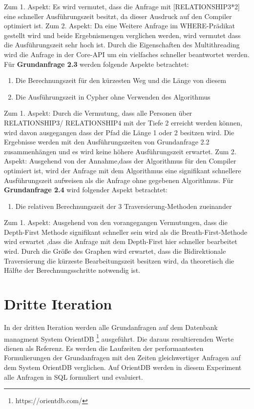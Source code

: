 Zum 1. Aspekt: Es wird vermutet, dass die Anfrage mit [RELATIONSHIP3*2] eine schneller Ausführungszeit besitzt, da dieser Ausdruck auf den Compiler optimiert ist. \newline
Zum 2. Aspekt: Da eine Weitere Anfrage im WHERE-Prädikat gestellt wird und beide Ergebnismengen verglichen werden, wird vermutet dass die Ausführungszeit sehr hoch ist. Durch die Eigenschaften des Multithreading wird die Anfrage in der Core-API um ein vielfaches schneller beantwortet werden. \newline  \newline
Für \textbf{Grundanfrage 2.3} werden folgende Aspekte betrachtet: 
\begin{enumerate}
	\item Die Berechnungszeit für den kürzesten Weg und die Länge von diesem
	\item Die Ausführungszeit in Cypher ohne Verwenden des Algorithmus
\end{enumerate}
Zum 1. Aspekt: Durch die Vermutung, dass alle Personen über RELATIONSHIP3/ RELATIONSHIP4 mit der Tiefe 2 erreicht werden können, wird davon ausgegangen dass der Pfad die Länge 1 oder 2 besitzen  wird. Die Ergebnisse werden mit den Ausführungszeiten von Grundanfrage 2.2 zusammenhängen und es wird keine höhere Ausführungszeit erwartet. \newline
Zum 2. Aspekt: Ausgehend von der Annahme,dass der Algorithmus für den Compiler optimiert ist, wird der Anfrage mit dem Algorithmus eine signifikant schnellere Ausführungszeit aufweisen als die Anfrage ohne gegebenen Algorithmus. \newline \newline
Für \textbf{Grundanfrage 2.4} wird folgender Aspekt betrachtet:
\begin{enumerate}
	\item Die relativen Berechnungszeit der 3 Traversierung-Methoden zueinander
\end{enumerate}
Zum 1. Aspekt: Ausgehend von den vorangegangen Vermutungen, dass die Depth-First Methode signifikant schneller sein wird  als die Breath-First-Methode wird erwartet ,dass die Anfrage mit dem Depth-First hier schneller bearbeitet wird. Durch die Größe des Graphen wird erwartet, dass die Bidirektionale Traversierung die kürzeste Bearbeitungszeit besitzen wird, da theoretisch die Hälfte der Berechnungsschritte notwendig ist. \newline
\section{Dritte Iteration}
In der dritten Iteration werden alle Grundanfragen auf dem Datenbank managment System OrientDB \footnote{https://orientdb.com/} ausgeführt. Die daraus resultierenden Werte dienen als Referenz. Es werden die Laufzeiten der performantesten Formulierungen der Grundanfragen mit den Zeiten gleichwertiger Anfragen auf dem System OrientDB verglichen. Auf OrientDB werden in diesem Experiment alle Anfragen in SQL formuliert und evaluiert.  
